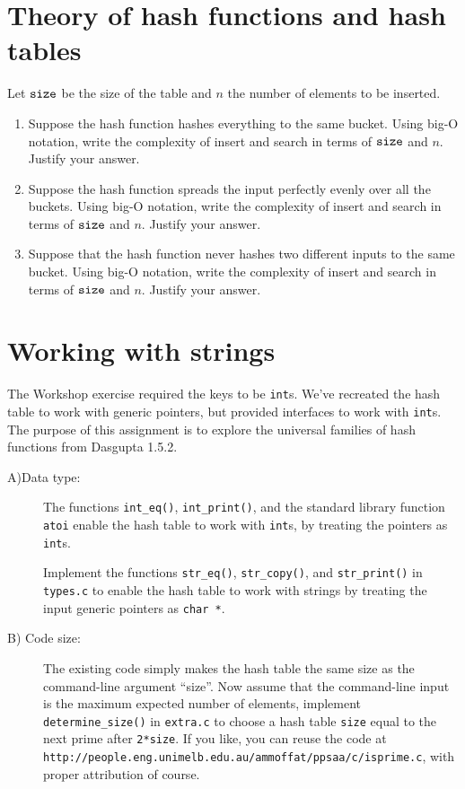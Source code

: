 \documentclass[11pt]{article}
\newcommand{\size}{{\tt size}}
\begin{document}
\section*{Theory of hash functions and hash tables}
Let $\size$ be the size of the table and $n$ the number of elements to be inserted.
\begin{enumerate}
        \item Suppose the hash function hashes everything to the same bucket.
            Using big-O notation, write the complexity of insert and search in
            terms of $\size$ and $n$.  Justify your answer.
        \item Suppose the hash function spreads the input perfectly evenly over
            all the buckets.  Using big-O notation, write the complexity of
            insert and search in terms of $\size$ and $n$.  Justify your
            answer.
        \item Suppose that the hash function never hashes two different inputs
            to the same bucket.  Using big-O notation, write the complexity of
            insert and search in terms of $\size$ and $n$.  Justify your
            answer.
      \end{enumerate}

\section*{Working with strings}
The Workshop exercise required the keys to be {\tt int}s. We've recreated the
hash table to work with generic pointers, but provided interfaces to work with
{\tt int}s. The purpose of this assignment is to explore the universal families
of hash functions from Dasgupta 1.5.2.

\begin{description}
    \item[A)Data type:]
        The functions {\tt int\_eq()}, {\tt int\_print()},
        and the standard library function {\tt atoi} enable the hash table to work with {\tt int}s,
        by treating the pointers as {\tt int}s.

        Implement the functions {\tt str\_eq()}, {\tt str\_copy()},
        and {\tt str\_print()} in {\tt types.c} to enable the hash table to work with
        strings by treating the input generic pointers as {\tt char *}.

    \item[B) Code size:]
        The existing code simply makes the hash table the same size as the command-line argument ``size''.
        Now assume that the command-line input is the maximum expected number of elements,
        implement {\tt determine\_size()} in {\tt extra.c} to choose a hash table {\tt size}
        equal to the next prime after {\tt 2*size}.
        If you like, you can reuse the code at
        {\tt http://people.eng.unimelb.edu.au/ammoffat/ppsaa/c/isprime.c},
        with proper attribution of course.
\end{description}
\end{document}
